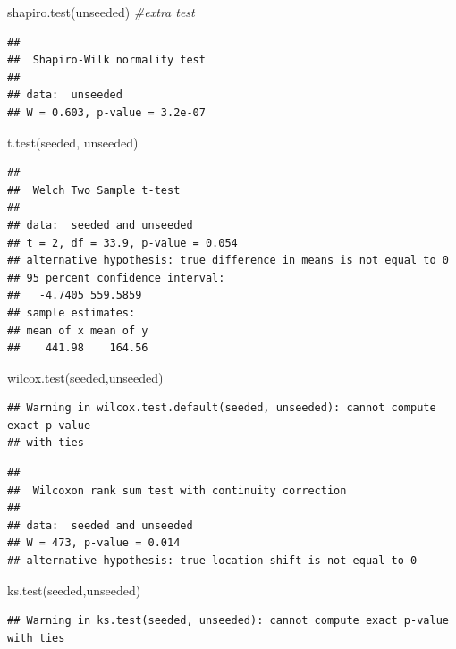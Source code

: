 \documentclass[
]{article}
\newenvironment{Shaded}{\begin{snugshade}}{\end{snugshade}}
\newcommand{\CommentTok}[1]{\textcolor[rgb]{0.56,0.35,0.01}{\textit{#1}}}
\newcommand{\FunctionTok}[1]{\textcolor[rgb]{0.00,0.00,0.00}{#1}}
\newcommand{\NormalTok}[1]{#1}
\begin{document}
\begin{Shaded}
\begin{Highlighting}[]
\FunctionTok{shapiro.test}\NormalTok{(unseeded) }\CommentTok{\#extra test}
\end{Highlighting}
\end{Shaded}

\begin{verbatim}
## 
##  Shapiro-Wilk normality test
## 
## data:  unseeded
## W = 0.603, p-value = 3.2e-07
\end{verbatim}

\begin{Shaded}
\begin{Highlighting}[]
\FunctionTok{t.test}\NormalTok{(seeded, unseeded)}
\end{Highlighting}
\end{Shaded}

\begin{verbatim}
## 
##  Welch Two Sample t-test
## 
## data:  seeded and unseeded
## t = 2, df = 33.9, p-value = 0.054
## alternative hypothesis: true difference in means is not equal to 0
## 95 percent confidence interval:
##   -4.7405 559.5859
## sample estimates:
## mean of x mean of y 
##    441.98    164.56
\end{verbatim}

\begin{Shaded}
\begin{Highlighting}[]
\FunctionTok{wilcox.test}\NormalTok{(seeded,unseeded)}
\end{Highlighting}
\end{Shaded}

\begin{verbatim}
## Warning in wilcox.test.default(seeded, unseeded): cannot compute exact p-value
## with ties
\end{verbatim}

\begin{verbatim}
## 
##  Wilcoxon rank sum test with continuity correction
## 
## data:  seeded and unseeded
## W = 473, p-value = 0.014
## alternative hypothesis: true location shift is not equal to 0
\end{verbatim}

\begin{Shaded}
\begin{Highlighting}[]
\FunctionTok{ks.test}\NormalTok{(seeded,unseeded)}
\end{Highlighting}
\end{Shaded}

\begin{verbatim}
## Warning in ks.test(seeded, unseeded): cannot compute exact p-value with ties
\end{verbatim}
\end{document}
